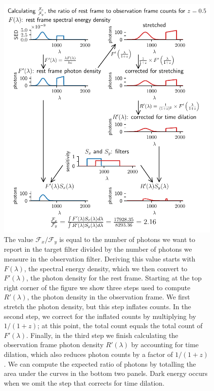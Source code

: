 \documentclass[aps,prl,reprint,amsmath,floatfix]{revtex4-2}
\begin{document}
\begin{figure}
  \includegraphics[width=\columnwidth]{k_equation_flow.pdf}
  \caption{The value $\mathcal{F}_x / \mathcal{F}_y$ is equal to the number of
  photons we want to report in the target filter divided by the number of
  photons we measure in the observation filter. Deriving this value starts with
  $F(\lambda)$, the spectral energy density, which we then convert to
  $F'(\lambda)$, the photon density for the rest frame. Starting at the top
  right corner of the figure we show three steps used to compute $R'(\lambda)$,
  the photon density in the observation frame. We first stretch the photon
  density, but this step inflates counts. In the second step, we correct for
  the inflated counts by multiplying by $1/(1+z)$; at this point, the total
  count equals the total count of $F'(\lambda)$. Finally, in the third step we
  finish calculating the observation frame photon density $R'(\lambda)$ by
  accounting for time dilation, which also reduces photon counts by a factor of
  $1/(1+z)$. We can compute the expected ratio of photons by totalling the area
  under the curves in the bottom two panels. Dark energy occurs when we omit
  the step that corrects for time dilation.
  }
  \label{fig:k-example}
\end{figure}
\end{document}
